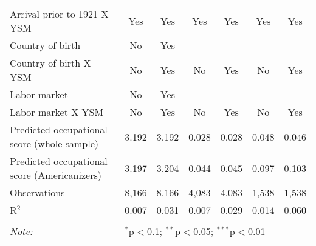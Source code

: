 \begin{landscape}
\begin{table}[H]
{\begin{tabular}{@{\extracolsep{5pt}}lcccccc}
Arrival prior to 1921 X YSM & Yes & Yes & Yes & Yes & Yes & Yes \\ 
Country of birth & No & Yes &  &  &  &  \\ 
Country of birth X YSM & No & Yes & No & Yes & No & Yes \\ 
Labor market & No & Yes &  &  &  &  \\ 
Labor market X YSM & No & Yes & No & Yes & No & Yes \\ 
Predicted occupational score (whole sample) & 3.192 & 3.192 & 0.028 & 0.028 & 0.048 & 0.046 \\ 
Predicted occupational score (Americanizers) & 3.197 & 3.204 & 0.044 & 0.045 & 0.097 & 0.103 \\ 
Observations & 8,166 & 8,166 & 4,083 & 4,083 & 1,538 & 1,538 \\ 
R$^{2}$ & 0.007 & 0.031 & 0.007 & 0.029 & 0.014 & 0.060 \\ 
\hline 
\hline \\[-1.8ex] 
\textit{Note:}  & \multicolumn{6}{l}{$^{*}$p$<$0.1; $^{**}$p$<$0.05; $^{***}$p$<$0.01} \\ 
\end{tabular}} 
\end{table} 
\end{landscape}